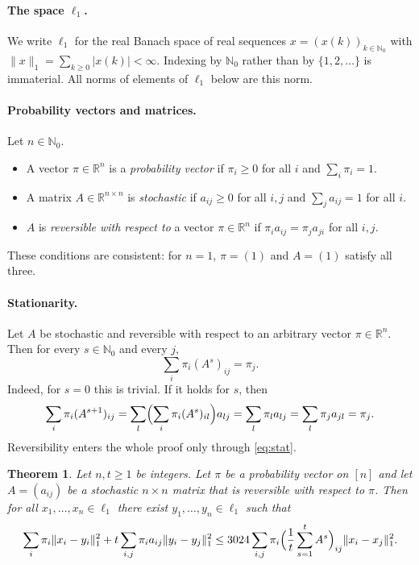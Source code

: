 \documentclass[11pt]{article}
\newtheorem{theorem}{Theorem}[section]
\theoremstyle{definition}
\theoremstyle{remark}
\newcommand{\R}{\mathbb{R}}
\newcommand{\Nz}{\mathbb{N}_0}
\begin{document}
\paragraph{The space $\ell_1$.} We write $\ell_1$ for the real Banach space of real sequences $x=(x(k))_{k\in\Nz}$ with $\|x\|_1=\sum_{k\ge0}|x(k)|<\infty$. Indexing by $\Nz$ rather than by $\{1,2,\dots\}$ is immaterial. All norms of elements of $\ell_1$ below are this norm.

\paragraph{Probability vectors and matrices.} Let $n\in\Nz$.
\begin{itemize}
\item A vector $\pi\in\R^n$ is a \emph{probability vector} if $\pi_i\ge0$ for all $i$ and $\sum_i\pi_i=1$.
\item A matrix $A\in\R^{n\times n}$ is \emph{stochastic} if $a_{ij}\ge0$ for all $i,j$ and $\sum_ja_{ij}=1$ for all $i$.
\item $A$ is \emph{reversible with respect to} a vector $\pi\in\R^n$ if $\pi_ia_{ij}=\pi_ja_{ji}$ for all $i,j$.
\end{itemize}
These conditions are consistent: for $n=1$, $\pi=(1)$ and $A=(1)$ satisfy all three.

\paragraph{Stationarity.} Let $A$ be stochastic and reversible with respect to an arbitrary vector $\pi\in\R^n$. Then for every $s\in\Nz$ and every $j$,
\begin{equation}\label{eq:stat}
\sum_{i}\pi_i(A^s)_{ij}=\pi_j .
\end{equation}
Indeed, for $s=0$ this is trivial. If it holds for $s$, then
\[
\sum_i\pi_i(A^{s+1})_{ij}=\sum_l\Bigl(\sum_i\pi_i(A^s)_{il}\Bigr)a_{lj}=\sum_l\pi_la_{lj}=\sum_l\pi_ja_{jl}=\pi_j .
\]
Reversibility enters the whole proof only through \eqref{eq:stat}.

\begin{theorem}\label{thm:main}
Let $n,t\ge1$ be integers. Let $\pi$ be a probability vector on $[n]$ and let $A=(a_{ij})$ be a stochastic $n\times n$ matrix that is reversible with respect to $\pi$. Then for all $x_1,\dots,x_n\in\ell_1$ there exist $y_1,\dots,y_n\in\ell_1$ such that
\[
\sum_i\pi_i\|x_i-y_i\|_1^2+t\sum_{i,j}\pi_ia_{ij}\|y_i-y_j\|_1^2
\le 3024\sum_{i,j}\pi_i\Bigl(\frac1t\sum_{s=1}^tA^s\Bigr)_{ij}\|x_i-x_j\|_1^2 .
\]
\end{theorem}
\end{document}
